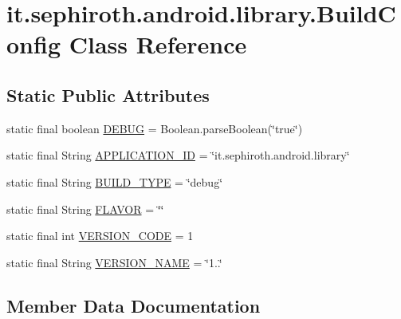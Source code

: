 \hypertarget{classit_1_1sephiroth_1_1android_1_1library_1_1_build_config}{}\section{it.\+sephiroth.\+android.\+library.\+Build\+Config Class Reference}
\label{classit_1_1sephiroth_1_1android_1_1library_1_1_build_config}
\subsection*{Static Public Attributes}
\begin{DoxyCompactItemize}
\item 
static final boolean \hyperlink{classit_1_1sephiroth_1_1android_1_1library_1_1_build_config_a5ac935e60d68724721a5ad88a1ade278}{D\+E\+B\+UG} = Boolean.\+parse\+Boolean(\char`\"{}true\char`\"{})
\item 
static final String \hyperlink{classit_1_1sephiroth_1_1android_1_1library_1_1_build_config_aedbb26ab5b0d3f0607d6a69fa5df0114}{A\+P\+P\+L\+I\+C\+A\+T\+I\+O\+N\+\_\+\+ID} = \char`\"{}it.\+sephiroth.\+android.\+library\char`\"{}
\item 
static final String \hyperlink{classit_1_1sephiroth_1_1android_1_1library_1_1_build_config_a8db6c46a0b68eaed38b282132200f774}{B\+U\+I\+L\+D\+\_\+\+T\+Y\+PE} = \char`\"{}debug\char`\"{}
\item 
static final String \hyperlink{classit_1_1sephiroth_1_1android_1_1library_1_1_build_config_aa8636f7dd301d9ee32397614a01c982d}{F\+L\+A\+V\+OR} = \char`\"{}\char`\"{}
\item 
static final int \hyperlink{classit_1_1sephiroth_1_1android_1_1library_1_1_build_config_a89a4bbbb5b0f90fd846a92a181019d76}{V\+E\+R\+S\+I\+O\+N\+\_\+\+C\+O\+DE} = 1
\item 
static final String \hyperlink{classit_1_1sephiroth_1_1android_1_1library_1_1_build_config_a9282796e203583f5161715d171e41096}{V\+E\+R\+S\+I\+O\+N\+\_\+\+N\+A\+ME} = \char`\"{}1..\char`\"{}
\end{DoxyCompactItemize}


\subsection{Member Data Documentation}
\mbox{\label{classit_1_1sephiroth_1_1android_1_1library_1_1_build_config_aedbb26ab5b0d3f0607d6a69fa5df0114}} 
